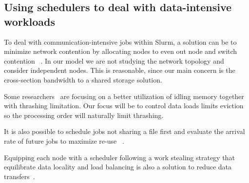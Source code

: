 \documentclass[conference,10pt]{IEEEtran}
\begin{document}
\subsection{Using schedulers to deal with data-intensive workloads}

To deal with communication-intensive jobs within Slurm, a solution can be to
minimize network contention by allocating nodes to even out node and switch contention
~\cite{minimize_network_contention}. 
In our model we are not studying the network topology and consider independent nodes.
This is reasonable, since our main concern is the cross-section bandwidth to a shared storage solution.

Some researchers~\cite{Nikolopoulos2003AdaptiveSU}
are focusing on a better utilization of idling memory together with 
thrashing limitation.
Our focus will be to control data loads limits eviction so the
processing order will naturally limit thrashing.

It is also possible to schedule jobs not sharing a file first
and evaluate the arrival rate of future jobs to maximize re-use
~\cite{Scheduling_Shared_Scans_of_Large_Data_Files}.

Equipping each node with a scheduler following a work
stealing strategy that equilibrate data locality 
and load balancing is also a solution to reduce data transfers~\cite{Optimizing_load_balancing_and_data_locality_with_data_aware_scheduling}.
\end{document}
